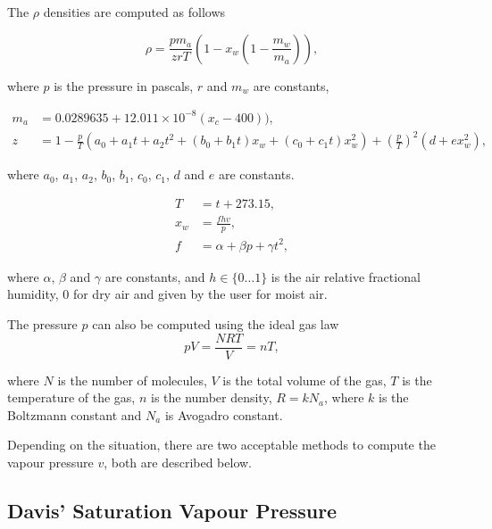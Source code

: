 The $\rho$ densities are computed as follows

\begin{equation}
\label{eq:ciddor_rho}
\rho =  \frac{p m_a}{zrT} \left( 1 - x_w \left(1 - \frac{m_w}{m_a} \right) \right), 
\end{equation}

where $p$ is the pressure in pascals, $r$ and $m_w$ are constants, 

\begin{align}
\label{eq:ciddor_m_a}
m_a &= 0.0289635 + 12.011 \times 10^{-8}(x_c - 400)),\\
\label{eq:ciddor_z}
z &= 1 - \frac{p}{T} \left(a_0 + a_1 t + a_2 t^2 + \left(b_0 + b_1 t \right) x_w + \left(c_0 + c_1 t \right) x_w^2 \right) + \left( \frac{p}{T} \right)^2 \left( d + ex_w^2 \right),
\end{align}

where $a_0$,  $a_1$, $a_2$,  $b_0$,  $b_1$,  $c_0$,  $c_1$,  $d$ and $e$ are constants.

\begin{align}
\label{eq:ciddor_t}
T &= t + 273.15, \\
\label{eq:ciddor_x_w}
x_w &= \frac{f h v}{ p}, \\
\label{eq:ciddor_f}
f &= \alpha + \beta p + \gamma t^2,
\end{align}

where $\alpha$, $\beta$ and $\gamma$ are constants, and $h \in \lbrace 0 \ldots 1 \rbrace$ is the air relative fractional humidity, $0$ for dry air and given by the user for moist air.

The pressure $p$ can also be computed using the ideal gas law
\begin{equation}
\label{eq:ciddor_p}
pV=\frac{NRT}{V} = n T,
\end{equation}

where $N$ is the number of molecules, $V$ is the total volume of the gas, $T$ is the temperature of the gas, $n$ is the number density, $R = k N_a$, where $k$ is the Boltzmann constant and $N_a$ is Avogadro constant.

Depending on the situation, there are two acceptable methods to compute the vapour pressure $v$, both are described below.

\subsection{Davis' Saturation Vapour Pressure}
\label{subsec:davis_v}

